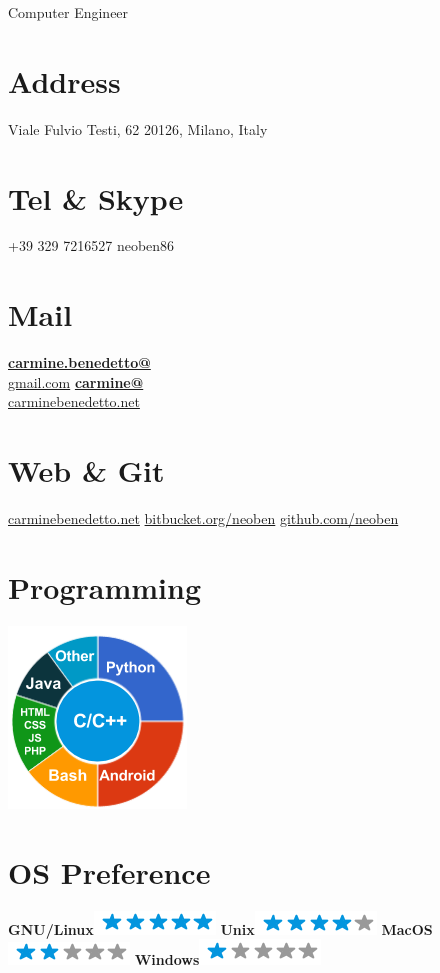 \documentclass[]{friggeri-cv}
\begin{document}
      {Computer Engineer}
      

\begin{aside}
  \section{Address}
    Viale Fulvio Testi, 62
    20126, Milano, Italy
    ~
  \section{Tel \& Skype}
    +39 329 7216527
    neoben86
    ~
  \section{Mail}
    \href{mailto:carmine.benedetto@gmail.com}{\textbf{carmine.benedetto@}\\gmail.com}
    \href{mailto:carmine@carminebenedetto.net}{\textbf{carmine@}\\carminebenedetto.net}
    ~
  \section{Web \& Git}
    \href{http://www.carminebenedetto.net}{carminebenedetto.net}
    \href{https://bitbucket.org/neoben}{bitbucket.org/neoben}
    \href{https://github.com/neoben}{github.com/neoben}
    ~
  \section{Programming}
    \includegraphics[scale=0.62]{img/programming.png}
    ~
  \section{OS Preference}
    \textbf{GNU/Linux}\includegraphics[scale=0.40]{img/5stars.png}
    \textbf{Unix}\includegraphics[scale=0.40]{img/4stars.png}
    \textbf{MacOS}\includegraphics[scale=0.40]{img/2stars.png}
    \textbf{Windows}\includegraphics[scale=0.40]{img/1stars.png}
    ~

\end{aside}
\end{document}
